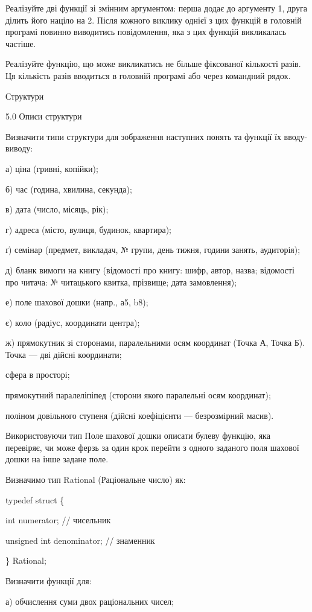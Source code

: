 \documentclass[]{article}
\begin{document}
Реалізуйте дві функції зі змінним аргументом: перша додає до аргументу
1, друга ділить його націло на 2. Після кожного виклику однієї з цих
функцій в головній програмі повинно виводитись повідомлення, яка з цих
функцій викликалась частіше.

Реалізуйте функцію, що може викликатись не більше фіксованої кількості
разів. Ця кількість разів вводиться в головній програмі або через
командний рядок.

\protect\hypertarget{_Hlk48905535}{}{}Структури

5.0 Описи структури

Визначити типи структури для зображення наступних понять та функції їх
вводу-виводу:

а) ціна (гривні, копійки);

б) час (година, хвилина, секунда);

в) дата (число, місяць, рік);

г) адреса (місто, вулиця, будинок, квартира);

ґ) семінар (предмет, викладач, № групи, день тижня, години занять,
аудиторія);

д) бланк вимоги на книгу (відомості про книгу: шифр, автор, назва;
відомості про читача: № читацького квитка, прізвище; дата замовлення);

е) поле шахової дошки (напр., а5, b8);

є) коло (радіус, координати центра);

ж) прямокутник зі сторонами, паралельними осям координат (Точка А, Точка
Б). Точка --- дві дійсні координати;

сфера в просторі;

прямокутний паралеліпіпед (сторони якого паралельні осям координат);

поліном довільного ступеня (дійсні коефіцієнти --- безрозмірний масив).

Використовуючи тип Поле шахової дошки описати булеву функцію, яка
перевіряє, чи може ферзь за один крок перейти з одного заданого поля
шахової дошки на інше задане поле.

Визначимо тип Rational (Раціональне число) як:

typedef struct \{

int numerator; // чисельник

unsigned int denominator; // знаменник

\} Rational;

Визначити функції для:

а) обчислення суми двох раціональних чисел;
\end{document}
